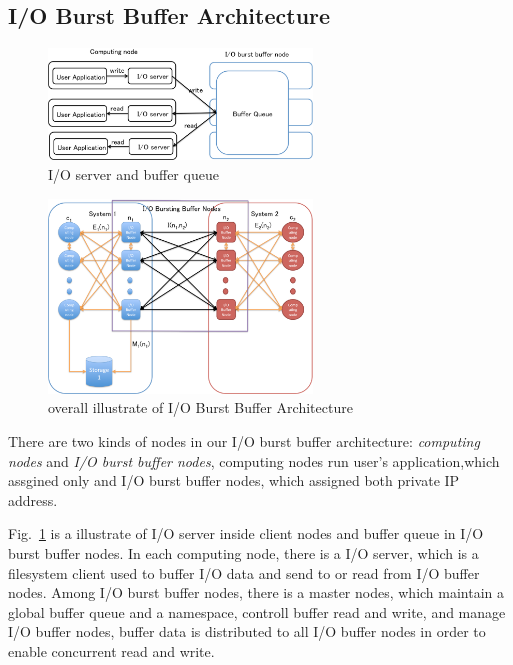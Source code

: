 \documentclass[JIP,draft]{ipsj}
\begin{document}
\subsection{I/O Burst Buffer Architecture}

\begin{figure}[tb]
	\centering
	\includegraphics[width=7cm]{IOserver}
	\caption{I/O server and buffer queue}
	\label{I/O server}
\end{figure}

\begin{figure}[tb]
	\centering
	\includegraphics[width=7cm]{overview}
	\caption{overall illustrate of I/O Burst Buffer Architecture}
	\label{overview}
\end{figure}

There are two kinds of nodes in our I/O burst buffer architecture: \emph{computing nodes} and \emph{I/O burst buffer nodes}, computing nodes run user's application,which assgined only  and I/O burst buffer nodes, which assigned both private IP address.

Fig.~\ref{I/O server} is a illustrate of I/O server inside client nodes and buffer queue in I/O burst buffer nodes.
In each computing node, there is a I/O server, which is a filesystem client used to buffer I/O data and send to or read from I/O buffer nodes.
Among I/O burst buffer nodes, there is a master nodes, which maintain a global buffer queue and a namespace, controll buffer read and write, and manage I/O buffer nodes, buffer data is distributed to all I/O buffer nodes in order to enable concurrent read and write.
\end{document}
